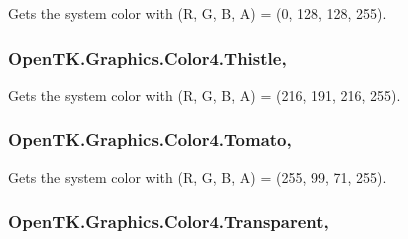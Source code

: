 Gets the system color with (R, G, B, A) = (0, 128, 128, 255). 

\hypertarget{struct_open_t_k_1_1_graphics_1_1_color4_ae84594b22b179dc42eb69d0252140af1}{
\subsubsection[{Thistle}]{ Open\-T\-K.\-Graphics.\-Color4.\-Thistle\hspace{0.3cm}{\ttfamily [static]}, {\ttfamily [get]}}}\label{struct_open_t_k_1_1_graphics_1_1_color4_ae84594b22b179dc42eb69d0252140af1}


Gets the system color with (R, G, B, A) = (216, 191, 216, 255). 

\hypertarget{struct_open_t_k_1_1_graphics_1_1_color4_a9c6426056debdfcf60226adddbe8d747}{
\subsubsection[{Tomato}]{ Open\-T\-K.\-Graphics.\-Color4.\-Tomato\hspace{0.3cm}{\ttfamily [static]}, {\ttfamily [get]}}}\label{struct_open_t_k_1_1_graphics_1_1_color4_a9c6426056debdfcf60226adddbe8d747}


Gets the system color with (R, G, B, A) = (255, 99, 71, 255). 

\hypertarget{struct_open_t_k_1_1_graphics_1_1_color4_aff989d1d2edd28e0e3f8f664fbc380bd}{
\subsubsection[{Transparent}]{ Open\-T\-K.\-Graphics.\-Color4.\-Transparent\hspace{0.3cm}{\ttfamily [static]}, {\ttfamily [get]}}}\label{struct_open_t_k_1_1_graphics_1_1_color4_aff989d1d2edd28e0e3f8f664fbc380bd}


